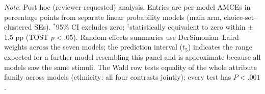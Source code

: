\begin{table}[tbp]
\smallskip
\parbox{\textwidth}{\footnotesize\textit{Note.} Post hoc (reviewer-requested) analysis. Entries are per-model AMCEs in percentage points from separate linear probability models (main arm, choice-set--clustered SEs). $^{*}$95\% CI excludes zero; $^{\dagger}$statistically equivalent to zero within $\pm$1.5 pp (TOST $p<.05$). Random-effects summaries use DerSimonian--Laird weights across the seven models; the prediction interval ($t_{5}$) indicates the range expected for a further model resembling this panel and is approximate because all models saw the same stimuli. The Wald row tests equality of the whole attribute family across models (ethnicity: all four contrasts jointly); every test has $P<.001$.}
\end{table}
